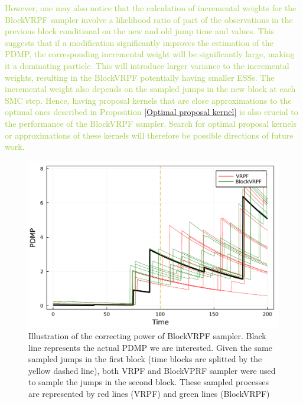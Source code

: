\documentclass[12pt,a4paper]{article}
\begin{document}
\textcolor{YellowGreen}
{However, one may also notice that the calculation of incremental weights for the BlockVRPF sampler involve a likelihood ratio of part of the observations in the previous block conditional on the new and old jump time and values. This suggests that if a modification significantly improves the estimation of the PDMP, the corresponding incremental weight will be significantly large, making it a dominating particle. This will introduce larger variance to the incremental weights, resulting in the BlockVRPF potentially having smaller ESSs. The incremental weight also depends on the sampled jumps in the new block at each SMC step. Hence, having proposal kernels that are close approximations to the optimal ones described in Proposition \ref{Optimal proposal kernel} is also crucial to the performance of the BlockVRPF sampler. Search for optimal proposal kernels or approximations of these kernels will therefore be possible directions of future work.}

\begin{figure}[htb!]
    \centering
    \includegraphics[width=\textwidth]{BlockVRPF_Illustration.pdf}
    \caption{Illustration of the correcting power of BlockVRPF sampler. Black line represents the actual PDMP we are interested. Given the same sampled jumps in the first block (time blocks are splitted by the yellow dashed line), both VRPF and BlockVPRF sampler were used to sample the jumps in the second block. These sampled processes are represented by red lines (VRPF) and green lines (BlockVRPF)}
    \label{BlockSMC_correction_illustration}
\end{figure}
\end{document}
